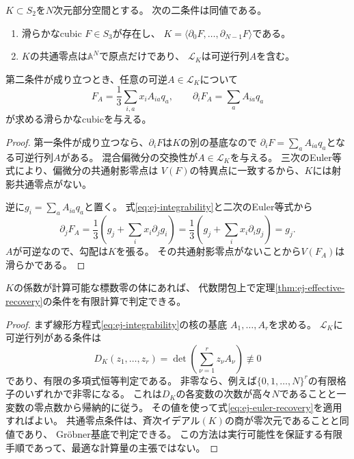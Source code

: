 \begin{theorem}[方程式抽出の必要十分条件]
\label{thm:ej-effective-recovery}
$K\subset S_2$を$N$次元部分空間とする。
次の二条件は同値である。
\begin{enumerate}
 \item 滑らかなcubic $F\in S_3$が存在し、
 $K=\langle\partial_0F,\ldots,\partial_{N-1}F\rangle$である。
 \item $K$の共通零点は$\mathbb A^N$で原点だけであり、
 $\mathcal L_K$は可逆行列$A$を含む。
\end{enumerate}
第二条件が成り立つとき、任意の可逆$A\in\mathcal L_K$について
\[
 \boxed{\quad
 F_A=\frac13\sum_{i,a}x_i A_{ia}q_a,
 \qquad \partial_iF_A=\sum_aA_{ia}q_a
 \quad}
 \tag{EJ5}\label{eq:ej-euler-recovery}
\]
が求める滑らかなcubicを与える。
\end{theorem}
\begin{proof}
第一条件が成り立つなら、$\partial_iF$は$K$の別の基底なので
$\partial_iF=\sum_a A_{ia}q_a$となる可逆行列$A$がある。
混合偏微分の交換性が$A\in\mathcal L_K$を与える。
三次のEuler等式により、偏微分の共通射影零点は
$V(F)$の特異点に一致するから、$K$には射影共通零点がない。

逆に$g_i=\sum_aA_{ia}q_a$と置く。
式\eqref{eq:ej-integrability}と二次のEuler等式から
\[
 \partial_jF_A
 =\frac13\left(g_j+\sum_i x_i\partial_jg_i\right)
 =\frac13\left(g_j+\sum_i x_i\partial_i g_j\right)=g_j.
\]
$A$が可逆なので、勾配は$K$を張る。
その共通射影零点がないことから$V(F_A)$は滑らかである。
\end{proof}

\begin{corollary}[有限の判定手順]
\label{cor:ej-finite-algorithm}
$K$の係数が計算可能な標数零の体にあれば、
代数閉包上で定理\ref{thm:ej-effective-recovery}の条件を有限計算で判定できる。
\end{corollary}
\begin{proof}
まず線形方程式\eqref{eq:ej-integrability}の核の基底
$A_1,\ldots,A_r$を求める。
$\mathcal L_K$に可逆行列がある条件は
\[
 D_K(z_1,\ldots,z_r)=\det\left(\sum_{\nu=1}^r z_\nu A_\nu\right)
 \not\equiv0
 \tag{EJ6}\label{eq:ej-determinant-test}
\]
であり、有限の多項式恒等判定である。
非零なら、例えば$\{0,1,\ldots,N\}^r$の有限格子のいずれかで非零になる。
これは$D_K$の各変数の次数が高々$N$であることと一変数の零点数から帰納的に従う。
その値を使って式\eqref{eq:ej-euler-recovery}を適用すればよい。
共通零点条件は、斉次イデアル$(K)$の商が零次元であることと同値であり、
Gr\"obner基底で判定できる。
この方法は実行可能性を保証する有限手順であって、最適な計算量の主張ではない。
\end{proof}


